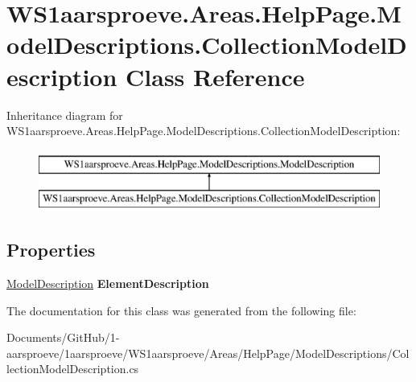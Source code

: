 \hypertarget{class_w_s1aarsproeve_1_1_areas_1_1_help_page_1_1_model_descriptions_1_1_collection_model_description}{}\section{W\+S1aarsproeve.\+Areas.\+Help\+Page.\+Model\+Descriptions.\+Collection\+Model\+Description Class Reference}
\label{class_w_s1aarsproeve_1_1_areas_1_1_help_page_1_1_model_descriptions_1_1_collection_model_description}
Inheritance diagram for W\+S1aarsproeve.\+Areas.\+Help\+Page.\+Model\+Descriptions.\+Collection\+Model\+Description\+:\begin{figure}[H]
\begin{center}
\leavevmode
\includegraphics[height=2.000000cm]{class_w_s1aarsproeve_1_1_areas_1_1_help_page_1_1_model_descriptions_1_1_collection_model_description}
\end{center}
\end{figure}
\subsection*{Properties}
\begin{DoxyCompactItemize}
\item 
\hypertarget{class_w_s1aarsproeve_1_1_areas_1_1_help_page_1_1_model_descriptions_1_1_collection_model_description_a6c7988db6c5bcba24f586ea0ed0d14cc}{}\hyperlink{class_w_s1aarsproeve_1_1_areas_1_1_help_page_1_1_model_descriptions_1_1_model_description}{Model\+Description} {\bfseries Element\+Description}\label{class_w_s1aarsproeve_1_1_areas_1_1_help_page_1_1_model_descriptions_1_1_collection_model_description_a6c7988db6c5bcba24f586ea0ed0d14cc}

\end{DoxyCompactItemize}


The documentation for this class was generated from the following file\+:\begin{DoxyCompactItemize}
\item 
Documents/\+Git\+Hub/1-\/aarsproeve/1aarsproeve/\+W\+S1aarsproeve/\+Areas/\+Help\+Page/\+Model\+Descriptions/Collection\+Model\+Description.\+cs\end{DoxyCompactItemize}
